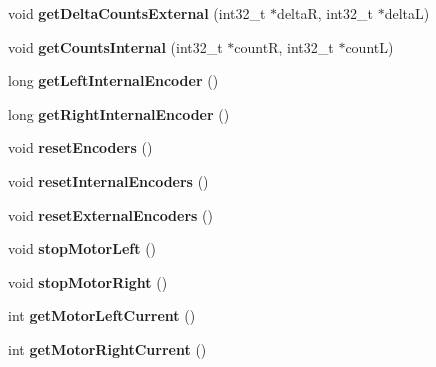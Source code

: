 \begin{DoxyCompactItemize}
\item 
\mbox{\label{classAsservDriver_a588e61ea789b256d73fd04b1f7a840b5}} 
void {\bfseries get\+Delta\+Counts\+External} (int32\+\_\+t $\ast$deltaR, int32\+\_\+t $\ast$deltaL)
\item 
\mbox{\label{classAsservDriver_a643c154d40a2842293fcbf433dc73ee1}} 
void {\bfseries get\+Counts\+Internal} (int32\+\_\+t $\ast$countR, int32\+\_\+t $\ast$countL)
\item 
\mbox{\label{classAsservDriver_a01959c5fd48ed61fedfb22a6c3605ea2}} 
long {\bfseries get\+Left\+Internal\+Encoder} ()
\item 
\mbox{\label{classAsservDriver_a00e162296e20e589d7117b2427908aa6}} 
long {\bfseries get\+Right\+Internal\+Encoder} ()
\item 
\mbox{\label{classAsservDriver_a1d4095fd5abc9597f5aa35fc4d02f3fa}} 
void {\bfseries reset\+Encoders} ()
\item 
\mbox{\label{classAsservDriver_a9375c998721a68c0fcdd1c538642fdc6}} 
void {\bfseries reset\+Internal\+Encoders} ()
\item 
\mbox{\label{classAsservDriver_a62108360983265520b0401a71f810f6a}} 
void {\bfseries reset\+External\+Encoders} ()
\item 
\mbox{\label{classAsservDriver_a69fb8c78d0ced7bd7f330c18952c84f4}} 
void {\bfseries stop\+Motor\+Left} ()
\item 
\mbox{\label{classAsservDriver_ab24bc1636143db604ecbad3b18a17c8c}} 
void {\bfseries stop\+Motor\+Right} ()
\item 
\mbox{\label{classAsservDriver_ab93d873dc060cff42befa9e50a4a0b32}} 
int {\bfseries get\+Motor\+Left\+Current} ()
\item 
\mbox{\label{classAsservDriver_ace1b02fcab067c77ee71a134614ace50}} 
int {\bfseries get\+Motor\+Right\+Current} ()
\item 

\end{DoxyCompactItemize}
